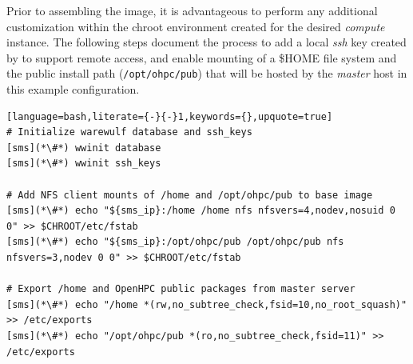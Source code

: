 Prior to assembling the image, it is advantageous to perform any additional
customization within the chroot environment created for the desired {\em
 compute} instance. The following steps document the process to add a local
{\em ssh} key created by \Warewulf{} to support remote access,
and enable \NFS{}
mounting of a \$HOME file system and the public \OHPC{} install path
(\texttt{/opt/ohpc/pub}) that will be hosted by the {\em master} host in this
example configuration.

\begin{lstlisting}[language=bash,literate={-}{-}1,keywords={},upquote=true]
# Initialize warewulf database and ssh_keys
[sms](*\#*) wwinit database
[sms](*\#*) wwinit ssh_keys

# Add NFS client mounts of /home and /opt/ohpc/pub to base image
[sms](*\#*) echo "${sms_ip}:/home /home nfs nfsvers=4,nodev,nosuid 0 0" >> $CHROOT/etc/fstab
[sms](*\#*) echo "${sms_ip}:/opt/ohpc/pub /opt/ohpc/pub nfs nfsvers=3,nodev 0 0" >> $CHROOT/etc/fstab

# Export /home and OpenHPC public packages from master server
[sms](*\#*) echo "/home *(rw,no_subtree_check,fsid=10,no_root_squash)" >> /etc/exports
[sms](*\#*) echo "/opt/ohpc/pub *(ro,no_subtree_check,fsid=11)" >> /etc/exports
\end{lstlisting}

